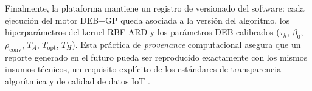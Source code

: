 Finalmente, la plataforma mantiene un registro de versionado del software: cada ejecución del motor DEB+GP queda asociada a la versión del algoritmo, los hiperparámetros del kernel RBF-ARD y los parámetros DEB calibrados ($\tau_h$, $\beta_0$, $\rho_{\text{conv}}$, $T_A$, $T_{\text{opt}}$, $T_H$). Esta práctica de \textit{provenance} computacional asegura que un reporte generado en el futuro pueda ser reproducido exactamente con los mismos insumos técnicos, un requisito explícito de los estándares de transparencia algorítmica \parencite{adadiPeekingBlackBoxSurvey2018} y de calidad de datos IoT \parencite{herrinCollateralDataQuality2021}.
